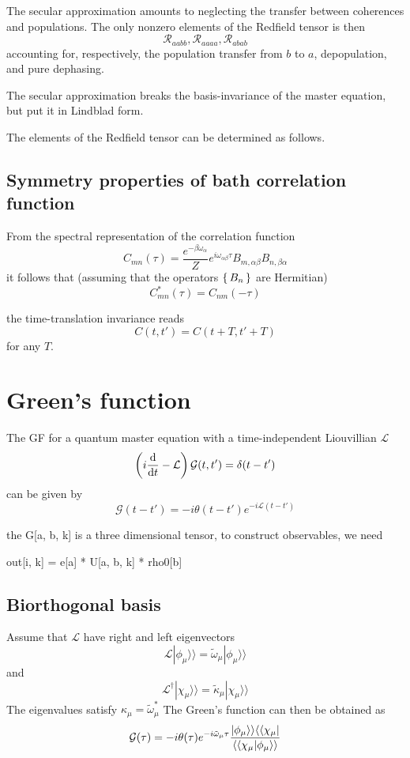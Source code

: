 \documentclass[a4paper,12pt]{book}
\newcommand{\mc}[1]{\mathcal{#1}}
\newcommand{\bbraket}[1]{\braket{\braket{#1}}}
\newcommand{\bbra}[1]{\langle\langle#1|}
\newcommand{\kket}[1]{| #1 \rangle\rangle}
\newcommand{\be}{\begin{equation}}
\newcommand{\ee}{\end{equation}}
\newcommand{\dt}{\frac{\text{d}}{\text{d}t}}
\renewcommand{\cite}{\text}
\begin{document}
The secular approximation amounts to neglecting the transfer between coherences and populations. The only nonzero elements of the Redfield tensor is then
\be
\mc{R}_{aabb}, \mc{R}_{aaaa},  \mc{R}_{ab ab}
\ee
accounting for, respectively, the population transfer from $b$ to $a$, depopulation, and pure dephasing.

The secular approximation breaks the basis-invariance of the master equation, but put it in Lindblad form.

The elements of the Redfield tensor can be determined as follows.


\subsection{Symmetry properties of bath correlation function}
From the spectral representation of the correlation function
\be
C_{mn}(\tau) = \frac{e^{-\beta \omega_\alpha}}{Z} e^{i \omega_{\alpha \beta} \tau}B_{m, \alpha \beta} B_{n, \beta \alpha}
\ee
it follows that (assuming that the operators $\set{B_n}$ are Hermitian)
\be
C^*_{mn}(\tau) = C_{nm}(-\tau)
\ee

the time-translation invariance reads
\be C(t,t') = C(t+T, t'+T)
\ee  for any $T $.


\section{Green's function}


The GF for a quantum master equation with a time-independent Liouvillian $\mc{L}$
\be
\del{i\dt - \mc{L}}\mc{G}(t,t') = \delta(t-t')
\ee
can be given by
\be
\mc{G}(t-t') = -i \theta(t-t') e^{-i\mc{L} (t-t') }
\ee


the G[a, b, k] is a three dimensional tensor, to construct observables, we need

out[i, k] = e[a] * U[a, b, k] * rho0[b]

\subsection{Biorthogonal basis}
Assume that $\mc{L}$ have right and left eigenvectors \cite{Brody2013}
\be
\mc{L}\kket{\phi_\mu} = \tilde{\omega}_\mu \kket{\phi_\mu}
\ee
and
\be
\mc{L}^\dag \kket{\chi_\mu} = \tilde{\kappa}_\mu \kket{\chi_\mu}
\label{eq:113}
\ee
The eigenvalues satisfy $\kappa_\mu = \tilde{\omega}_\mu^*$
The Green's function can then be obtained as
\be
\mc{G}(\tau) = -i \theta(\tau) e^{-i\tilde{\omega}_\mu \tau} \frac{\kket{\phi_\mu}\bbra{\chi_\mu}}{\bbraket{\chi_\mu|\phi_\mu}}
\ee
\end{document}
